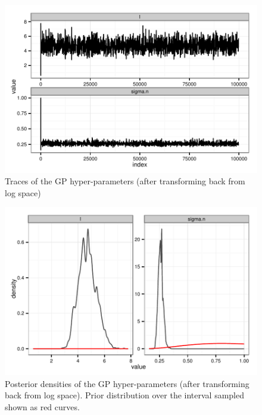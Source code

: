 \documentclass[author-year, review]{elsarticle} %
\makeatletter
\def\maxwidth{\ifdim\Gin@nat@width>\linewidth\linewidth
\else\Gin@nat@width\fi}
\let\Oldincludegraphics\includegraphics
\renewcommand{\includegraphics}[1]{\Oldincludegraphics[width=\maxwidth]{#1}}
\makeatother
\begin{document}
\begin{figure}[htbp]
\centering
\includegraphics{gp_traces_densities1.pdf}
\caption{Traces of the GP hyper-parameters (after transforming back from
log space)}
\end{figure}

\begin{figure}[htbp]
\centering
\includegraphics{gp_traces_densities2.pdf}
\caption{Posterior densities of the GP hyper-parameters (after
transforming back from log space). Prior distribution over the interval
sampled shown as red curves.}
\end{figure}
\end{document}
